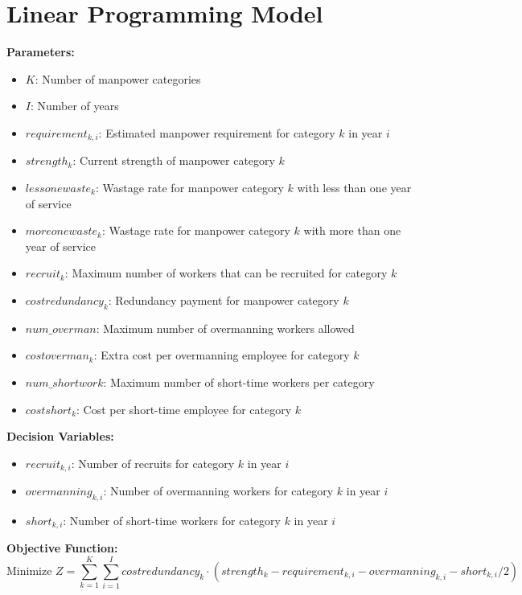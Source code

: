 \documentclass{article}
\begin{document}
\section*{Linear Programming Model}

\textbf{Parameters:}
\begin{itemize}
    \item $K$: Number of manpower categories
    \item $I$: Number of years
    \item $requirement_{k,i}$: Estimated manpower requirement for category $k$ in year $i$
    \item $strength_{k}$: Current strength of manpower category $k$
    \item $lessonewaste_{k}$: Wastage rate for manpower category $k$ with less than one year of service
    \item $moreonewaste_{k}$: Wastage rate for manpower category $k$ with more than one year of service
    \item $recruit_{k}$: Maximum number of workers that can be recruited for category $k$
    \item $costredundancy_{k}$: Redundancy payment for manpower category $k$
    \item $num\_overman$: Maximum number of overmanning workers allowed
    \item $costoverman_{k}$: Extra cost per overmanning employee for category $k$
    \item $num\_shortwork$: Maximum number of short-time workers per category
    \item $costshort_{k}$: Cost per short-time employee for category $k$
\end{itemize}

\textbf{Decision Variables:}
\begin{itemize}
    \item $recruit_{k,i}$: Number of recruits for category $k$ in year $i$
    \item $overmanning_{k,i}$: Number of overmanning workers for category $k$ in year $i$
    \item $short_{k,i}$: Number of short-time workers for category $k$ in year $i$
\end{itemize}

\textbf{Objective Function:}
\[
\text{Minimize } Z = \sum_{k=1}^{K} \sum_{i=1}^{I} costredundancy_{k} \cdot (strength_{k} - requirement_{k,i} - overmanning_{k,i} - short_{k,i}/2)
\]
\end{document}
